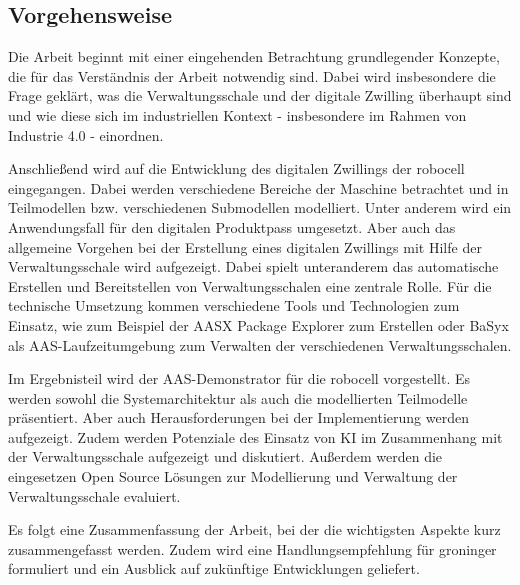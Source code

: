 \subsection{Vorgehensweise}
Die Arbeit beginnt mit einer eingehenden Betrachtung grundlegender Konzepte, die für das Verständnis der Arbeit notwendig sind. 
Dabei wird insbesondere die Frage geklärt, was die Verwaltungsschale und der digitale Zwilling überhaupt sind und wie diese sich im industriellen Kontext - insbesondere im Rahmen von Industrie 4.0 - einordnen.

Anschließend wird auf die Entwicklung des digitalen Zwillings der robocell eingegangen. 
Dabei werden verschiedene Bereiche der Maschine betrachtet und in Teilmodellen bzw. verschiedenen Submodellen modelliert.
Unter anderem wird ein Anwendungsfall für den digitalen Produktpass umgesetzt.
Aber auch das allgemeine Vorgehen bei der Erstellung eines digitalen Zwillings mit Hilfe der Verwaltungsschale wird aufgezeigt.
Dabei spielt unteranderem das automatische Erstellen und Bereitstellen von Verwaltungsschalen eine zentrale Rolle.
Für die technische Umsetzung kommen verschiedene Tools und Technologien zum Einsatz, wie zum Beispiel der AASX Package Explorer zum Erstellen oder BaSyx als AAS-Laufzeitumgebung zum Verwalten der verschiedenen Verwaltungsschalen.


Im Ergebnisteil wird der AAS-Demonstrator für die robocell vorgestellt. Es werden sowohl die Systemarchitektur als auch die modellierten Teilmodelle präsentiert.
Aber auch Herausforderungen bei der Implementierung werden aufgezeigt.
Zudem werden Potenziale des Einsatz von KI im Zusammenhang mit der Verwaltungsschale aufgezeigt und diskutiert.
Außerdem werden die eingesetzen Open Source Lösungen zur Modellierung und Verwaltung der Verwaltungsschale evaluiert.


Es folgt eine Zusammenfassung der Arbeit, bei der die wichtigsten Aspekte kurz zusammengefasst werden.
Zudem wird eine Handlungsempfehlung für groninger formuliert und ein Ausblick auf zukünftige Entwicklungen geliefert.